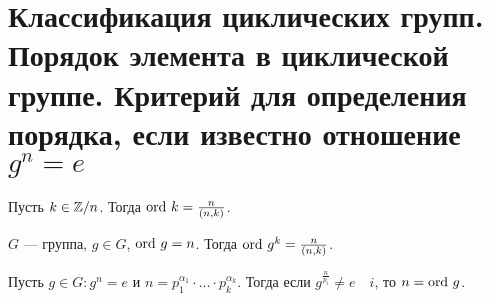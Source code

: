 % 
% 
\section{Классификация циклических групп. Порядок элемента в циклической группе. Критерий для определения порядка, если известно отношение $ g^{n}=e$}
\begin{lm}
    Пусть $ k \in  \mathbb{Z} / n$. Тогда $ {\mathop{\text{\rm ord}}}~ k = \frac{n}{(n, k)}$.
\end{lm}
\begin{cor}
    $ G$ --- группа, $ g \in G$, $ {\mathop{\text{\rm ord}}}~ g = n$. Тогда   $ {\mathop{\text{\rm ord}}}~ g^{k} = \frac{n}{(n, k)}$.
\end{cor}
\begin{lm}
    Пусть $ g \in G \colon g^{n} = e$ и $ n = p_1^{ \alpha _1} \cdot \ldots \cdot p_k^{ \alpha _k}$. Тогда если $ g^{\frac{n}{p_i}} \ne e \quad i$, то $ n = {\mathop{\text{\rm ord}}}~ g$.
\end{lm}
% 
